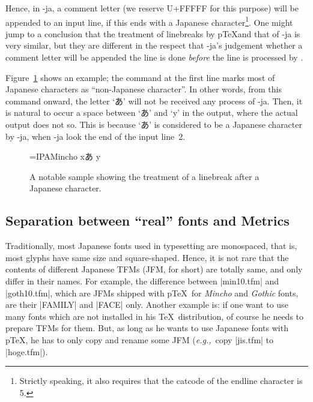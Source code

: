 \documentclass{ajt}
\begin{document}
Hence, in \LuaTeX-ja, a comment letter (we reserve U+FFFFF for this
purpose) will be appended to an input line, if this ends with a Japanese
character\footnote{Strictly speaking, it also requires that the catcode
of the endline character is 5.}. One might jump to a conclusion that the
treatment of linebreaks by p\TeX and that of \LuaTeX-ja is very similar,
but they are different in the respect that \LuaTeX-ja's judgement
whether a comment letter will be appended the line is done \emph{before}
the line is processed by \LuaTeX.

Figure~\ref{fig-linebreak} shows an example; the command at the first
line marks most of Japanese characters as ``non-Japanese character''. In
other words, from this command onward, the letter `あ' will not be
received any process of \LuaTeX-ja. Then, it is natural to occur a space
between `あ' and `y' in the output, where the actual output does not so.
This is because `あ' is considered to be a Japanese character by
\LuaTeX-ja, when \LuaTeX-ja look the end of the input line~2.
\begin{figure}
\begin{LTXexample}
\font\x=IPAMincho \x
{}xあ
y
\end{LTXexample}
\caption{A notable sample showing the treatment of a linebreak after a Japanese character.}\label{fig-linebreak}
\end{figure}

\subsection{Separation between ``real'' fonts and Metrics}
Traditionally, most Japanese fonts used in typesetting are monospaced,
that is, most glyphs have same size and square-shaped. Hence, it is not
rare that the contents of different Japanese TFMs (JFM, for short) are
totally same, and only differ in their names. For example, the
difference between |min10.tfm| and |goth10.tfm|, which are JFMs shipped
with p\TeX\ for \emph{Mincho} and \emph{Gothic} fonts, are their
|FAMILY| and |FACE| only. Another example is: if one want to use many
fonts which are not installed in his \TeX\ distribution, of course he
needs to prepare TFMs for them. But, as long as he wants to use Japanese
fonts with p\TeX, he has to only copy and rename some JFM (\emph{e.g.,}~copy |jis.tfm| to |hoge.tfm|).
\end{document}
